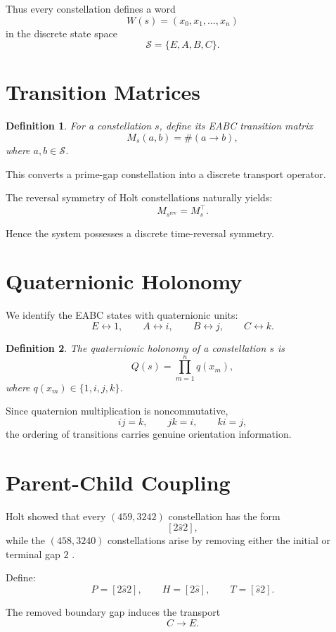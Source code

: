 \documentclass[11pt]{article}
\newtheorem{definition}{Definition}
\begin{document}
	Thus every constellation defines a word
	\[
	W(s)=(x_0,x_1,\dots,x_n)
	\]
	in the discrete state space
	\[
	\mathcal S=\{E,A,B,C\}.
	\]
	
	\section{Transition Matrices}
	
	\begin{definition}
		For a constellation $s$, define its EABC transition matrix
		\[
		M_s(a,b)=\#(a\to b),
		\]
		where $a,b\in\mathcal S$.
	\end{definition}
	
	This converts a prime-gap constellation into a discrete transport operator.
	
	The reversal symmetry of Holt constellations naturally yields:
	\[
	M_{s^{\mathrm{rev}}}=M_s^\top.
	\]
	
	Hence the system possesses a discrete time-reversal symmetry.
	
	\section{Quaternionic Holonomy}
	
	We identify the EABC states with quaternionic units:
	\[
	E\leftrightarrow 1,\qquad
	A\leftrightarrow i,\qquad
	B\leftrightarrow j,\qquad
	C\leftrightarrow k.
	\]
	
	\begin{definition}
		The quaternionic holonomy of a constellation $s$ is
		\[
		Q(s)=\prod_{m=1}^n q(x_m),
		\]
		where $q(x_m)\in\{1,i,j,k\}$.
	\end{definition}
	
	Since quaternion multiplication is noncommutative,
	\[
	ij=k,\qquad
	jk=i,\qquad
	ki=j,
	\]
	the ordering of transitions carries genuine orientation information.
	
	\section{Parent-Child Coupling}
	
	Holt showed that every $(459,3242)$ constellation has the form
	\[
	[2\hat s2],
	\]
	while the $(458,3240)$ constellations arise by removing either the initial or terminal gap $2$ \cite{holt}.
	
	Define:
	\[
	P=[2\hat s2],
	\qquad
	H=[2\hat s],
	\qquad
	T=[\hat s2].
	\]
	
	The removed boundary gap induces the transport
	\[
	C\to E.
	\]
	
\end{document}
